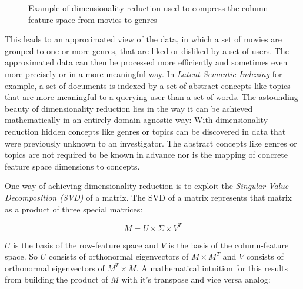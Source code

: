 \begin{figure}[h]
\centering
{}
\caption{Example of dimensionality reduction used to compress the column feature space from movies to genres}
\label{fig:exmpl_dr}
\end{figure}

 This leads to an approximated view of the data, in which a set of movies are grouped to one or more genres, that are liked or disliked by a set of users. The approximated data can then be processed more efficiently and sometimes even more precisely or in a more meaningful way. In \textsl{Latent Semantic Indexing} for example, a set of documents is indexed by a set of abstract concepts like topics that are more meaningful to a querying user than a set of words. The astounding beauty of dimensionality reduction lies in the way it can be achieved mathematically in an entirely domain agnostic way: With dimensionality reduction hidden concepts like genres or topics can be discovered in data that were previously unknown to an investigator. The abstract concepts like genres or topics are not required to be known in advance nor is the mapping of concrete feature space dimensions to concepts.

One way of achieving dimensionality reduction is to exploit the \textsl{Singular Value Decomposition (SVD)} of a matrix. The SVD of a matrix represents that matrix as a product of three special matrices:

\begin{equation}
	M = U \times \Sigma \times V^T
\end{equation}

$U$ is the basis of the row-feature space and $V$ is the basis of the column-feature space. So $U$ consists of orthonormal eigenvectors of $M\times M^T$ and $V$ consists of orthonormal eigenvectors of $M^T\times M$. A mathematical intuition for this results from building the product of $M$ with it's transpose and vice versa analog:


